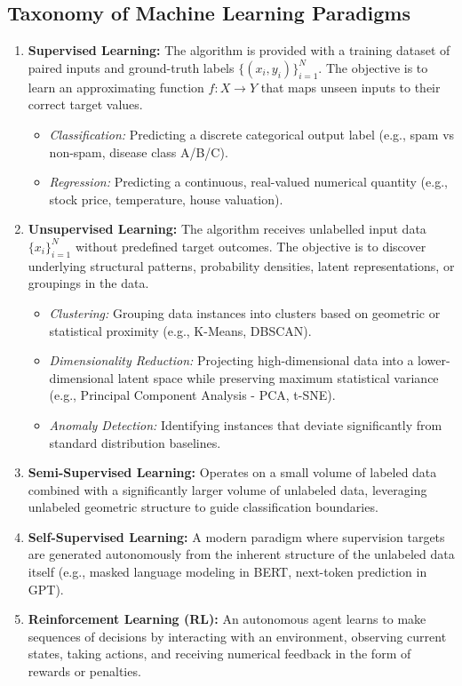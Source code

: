 \subsection{Taxonomy of Machine Learning Paradigms}
\begin{enumerate}[label=\bfseries\arabic*.]
    \item \textbf{Supervised Learning:} The algorithm is provided with a training dataset of paired inputs and ground-truth labels $\{ (x_i, y_i) \}_{i=1}^N$. The objective is to learn an approximating function $f: X \to Y$ that maps unseen inputs to their correct target values.
    \begin{itemize}
        \item \textit{Classification:} Predicting a discrete categorical output label (e.g., spam vs non-spam, disease class A/B/C).
        \item \textit{Regression:} Predicting a continuous, real-valued numerical quantity (e.g., stock price, temperature, house valuation).
    \end{itemize}
    \item \textbf{Unsupervised Learning:} The algorithm receives unlabelled input data $\{ x_i \}_{i=1}^N$ without predefined target outcomes. The objective is to discover underlying structural patterns, probability densities, latent representations, or groupings in the data.
    \begin{itemize}
        \item \textit{Clustering:} Grouping data instances into clusters based on geometric or statistical proximity (e.g., K-Means, DBSCAN).
        \item \textit{Dimensionality Reduction:} Projecting high-dimensional data into a lower-dimensional latent space while preserving maximum statistical variance (e.g., Principal Component Analysis - PCA, t-SNE).
        \item \textit{Anomaly Detection:} Identifying instances that deviate significantly from standard distribution baselines.
    \end{itemize}
    \item \textbf{Semi-Supervised Learning:} Operates on a small volume of labeled data combined with a significantly larger volume of unlabeled data, leveraging unlabeled geometric structure to guide classification boundaries.
    \item \textbf{Self-Supervised Learning:} A modern paradigm where supervision targets are generated autonomously from the inherent structure of the unlabeled data itself (e.g., masked language modeling in BERT, next-token prediction in GPT).
    \item \textbf{Reinforcement Learning (RL):} An autonomous agent learns to make sequences of decisions by interacting with an environment, observing current states, taking actions, and receiving numerical feedback in the form of rewards or penalties.
\end{enumerate}


